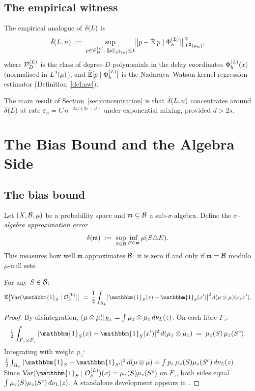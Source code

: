 \subsection{The empirical witness}

The empirical analogue of $\delta(L)$ is
\[
  \hat{\delta}(L,n)
  \;:=\;
  \sup_{p \in \mathcal{P}_D^{(L)},\, \|p\|_{L^{2}(\mu)} \leq 1}
  \bigl\|p - \hat{\mathbb{E}}[p \mid \Phi_h^{(L)}]\bigr\|_{L^{2}(\mu_n)}^2,
\]
where $\mathcal{P}_D^{(L)}$ is the class of degree-$D$ polynomials in the delay coordinates
$\Phi_h^{(L)}(x)$ (normalised in $L^{2}(\mu)$), and $\hat{\mathbb{E}}[p \mid \Phi_h^{(L)}]$ is the
Nadaraya--Watson kernel regression estimator (Definition~\ref{def:nw}).

The main result of Section~\ref{sec:concentration} is that $\hat{\delta}(L,n)$
concentrates around $\delta(L)$ at rate $\varepsilon_n = C\,n^{-2s/(2s+d)}$
under exponential mixing, provided $d > 2s$.

\section{The Bias Bound and the Algebra Side}
\label{sec:bias}

\subsection{The bias bound}

Let $(X, \mathcal{B}, \mu)$ be a probability space and $\mathfrak{m} \subseteq \mathcal{B}$
a sub-$\sigma$-algebra.
Define the \emph{$\sigma$-algebra approximation error}
\begin{equation}
  \delta(\mathfrak{m})
  \;:=\;
  \sup_{S \in \mathcal{B}} \inf_{E \in \mathfrak{m}} \mu(S \triangle E).
  \label{eq:delta-def}
\end{equation}
This measures how well $\mathfrak{m}$ approximates $\mathcal{B}$: it is zero if and
only if $\mathfrak{m} = \mathcal{B}$ modulo $\mu$-null sets.

\begin{lemma}
\label{lem:cond-var}
For any $S \in \mathcal{B}$:
\[
  \mathbb{E}\bigl[\mathrm{Var}(\mathbbm{1}_S \mid \OhL)\bigr]
  \;=\;
  \frac{1}{2}
  \int_{\RL}
  \bigl|\mathbbm{1}_S(x) - \mathbbm{1}_S(x')\bigr|^2
  \,d(\mu \otimes \mu)(x,x').
\]
\end{lemma}

\begin{proof}
By disintegration, $(\mu \otimes \mu)|_{R_L} = \int \mu_z \otimes \mu_z\,d\nu_L(z)$.
On each fibre $F_z$:
\[
  \tfrac{1}{2}\int_{F_z \times F_z}
    |\mathbbm{1}_S(x) - \mathbbm{1}_S(x')|^2
    \,d(\mu_z \otimes \mu_z)
  \;=\; \mu_z(S)\,\mu_z(S^c).
\]
Integrating with weight $p_z$:
$\tfrac{1}{2}\int_{\RL}|\mathbbm{1}_S - \mathbbm{1}_{S'}|^2\,d(\mu\otimes\mu)
= \int p_z\,\mu_z(S)\mu_z(S^c)\,d\nuL(z)$.
Since $\mathrm{Var}(\mathbbm{1}_S \mid \OhL)(x) = \mu_z(S)\mu_z(S^c)$ on $F_z$,
both sides equal $\int \mu_z(S)\mu_z(S^c)\,d\nu_L(z)$.
A standalone development appears in \cite{mahon_bridge}.
\end{proof}

